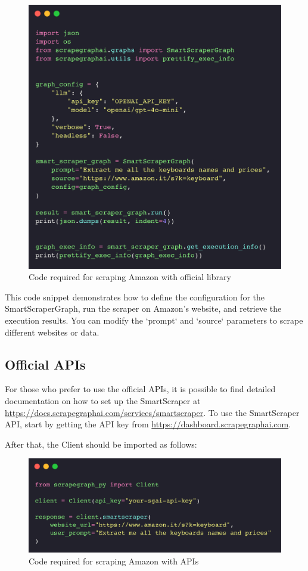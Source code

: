 \begin{figure}[H]
    \centering
    \includegraphics[width=0.95\linewidth]{Assets/library.png}
    \caption{Code required for scraping Amazon with official library}
    \label{fig:enter-label}
\end{figure}

This code snippet demonstrates how to define the configuration for the SmartScraperGraph, run the scraper on Amazon's website, and retrieve the execution results. You can modify the `prompt` and `source` parameters to scrape different websites or data.

\subsection{Official APIs}

For those who prefer to use the official APIs, it is possible to find detailed documentation on how to set up the SmartScraper at \url{https://docs.scrapegraphai.com/services/smartscraper}. 
To use the SmartScraper API, start by getting the API key from \url{https://dashboard.scrapegraphai.com}.

After that, the Client should be imported as follows:

\begin{figure}[H]
    \centering
    \includegraphics[width=0.95\linewidth]{Assets/api.png}
    \caption{Code required for scraping Amazon with APIs}
    \label{fig:enter-label}
\end{figure}

